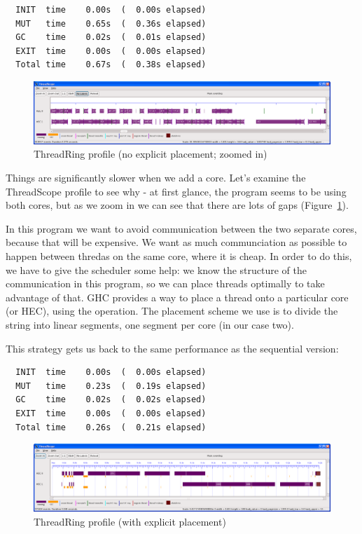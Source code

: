 \begin{verbatim}
  INIT  time    0.00s  (  0.00s elapsed)
  MUT   time    0.65s  (  0.36s elapsed)
  GC    time    0.02s  (  0.01s elapsed)
  EXIT  time    0.00s  (  0.00s elapsed)
  Total time    0.67s  (  0.38s elapsed)
\end{verbatim}

\begin{figure}
\begin{center}
\includegraphics[scale=0.3]{threadring1.png}
\end{center}
\caption{ThreadRing profile (no explicit placement; zoomed in)}
\label{f:threadring1}
\end{figure}

Things are significantly slower when we add a core.  Let's examine the
ThreadScope profile to see why - at first glance, the program seems to
be using both cores, but as we zoom in we can see that there are lots
of gaps (Figure~\ref{f:threadring1}).  

In this program we want to avoid communication between the two
separate cores, because that will be expensive.  We want as much
communciation as possible to happen between thredas on the same core,
where it is cheap.  In order to do this, we have to give the scheduler
some help: we know the structure of the communication in this program,
so we can place threads optimally to take advantage of that.  GHC
provides a way to place a thread onto a particular core (or HEC),
using the  operation.  The placement scheme we use is
to divide the string into linear segments, one segment per core (in
our case two).

This strategy gets us back to the same performance as the sequential
version:

\begin{verbatim}
  INIT  time    0.00s  (  0.00s elapsed)
  MUT   time    0.23s  (  0.19s elapsed)
  GC    time    0.02s  (  0.02s elapsed)
  EXIT  time    0.00s  (  0.00s elapsed)
  Total time    0.26s  (  0.21s elapsed)
\end{verbatim}

\begin{figure}
\begin{center}
\includegraphics[scale=0.3]{threadring2.png}
\end{center}
\caption{ThreadRing profile (with explicit placement)}
\label{f:threadring2}
\end{figure}

